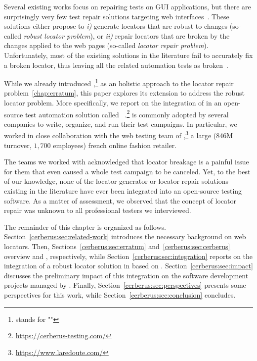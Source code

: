 Several existing works focus on repairing tests on GUI applications, but there are surprisingly very few test repair solutions targeting web interfaces~\cite{imtiaz2019systematic}.
These solutions either propose to \emph{i)} generate locators that are robust to changes (so-called \emph{robust locator problem}), or \emph{ii)} repair locators that are broken by the changes applied to the web pages (so-called \emph{locator repair problem}).
Unfortunately, most of the existing solutions in the literature fail to accurately fix a broken locator, thus leaving all the related automation tests as broken~\cite{hammoudi2016record}.

While we already introduced \erratum{},\footnote{\erratum{} stands for "\erratumlong{}"} as an holistic approach to the locator repair problem~\ref{chap:erratum}, this         paper explores its extension to address the robust locator problem.
More specifically, we report on the integration of \erratum{} in an open-source test automation solution called \cerberus{}~\cite{cerberus-icst20}.\footnote{\url{https://cerberus-testing.com/}}
\cerberus{} is commonly adopted by several companies to write, organize, and run their test campaigns.
In particular, we worked in close collaboration with the web testing team of \laredoute{},\footnote{\url{https://www.laredoute.com/}} a large (846M turnover, $1,700$ employees) french online fashion retailer.

The teams we worked with acknowledged that locator breakage is a painful issue for them that even caused a whole test campaign to be canceled.
Yet, to the best of our knowledge, none of the locator generator or locator repair solutions existing in the literature have ever been integrated into an open-source testing software.
As a matter of assessment, we observed that the concept of locator repair was unknown to all professional testers we interviewed.


The remainder of this chapter is organized as follows.
Section~\ref{cerberus:sec:related-work} introduces the necessary background on web locators.
% 
Then, Sections~\ref{cerberus:sec:erratum} and~\ref{cerberus:sec:cerberus} overview \erratum and \cerberus, respectively, while Section~\ref{cerberus:sec:integration} reports on the integration of a robust locator solution in \cerberus based on \erratum.
Section~\ref{cerberus:sec:impact} discusses the preliminary impact of this integration on the software development projects managed by \laredoute.
% 
Finally, Section~\ref{cerberus:sec:perspectives} presents some perspectives for this work, while Section~\ref{cerberus:sec:conclusion} concludes.


